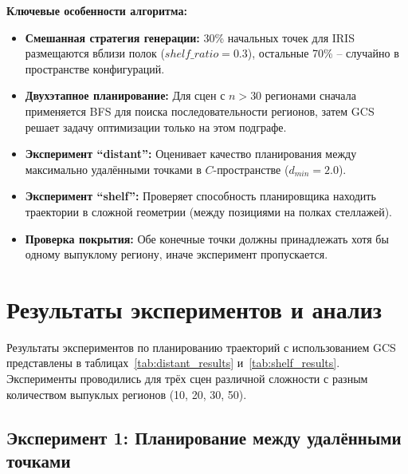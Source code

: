 \documentclass[a4paper]{article}
\begin{document}
\textbf{Ключевые особенности алгоритма:}
\begin{itemize}
    \item \textbf{Смешанная стратегия генерации:} 30\% начальных точек для IRIS размещаются вблизи полок ($shelf\_ratio = 0.3$), остальные 70\% -- случайно в пространстве конфигураций.
    
    \item \textbf{Двухэтапное планирование:} Для сцен с $n > 30$ регионами сначала применяется BFS для поиска последовательности регионов, затем GCS решает задачу оптимизации только на этом подграфе.
    
    \item \textbf{Эксперимент ``distant'':} Оценивает качество планирования между максимально удалёнными точками в $C$-пространстве ($d_{min} = 2.0$).
    
    \item \textbf{Эксперимент ``shelf'':} Проверяет способность планировщика находить траектории в сложной геометрии (между позициями на полках стеллажей).
    
    \item \textbf{Проверка покрытия:} Обе конечные точки должны принадлежать хотя бы одному выпуклому региону, иначе эксперимент пропускается.
\end{itemize}


\section{Результаты экспериментов и анализ}

Результаты экспериментов по планированию траекторий с использованием GCS представлены в таблицах~\ref{tab:distant_results} и~\ref{tab:shelf_results}. Эксперименты проводились для трёх сцен различной сложности с разным количеством выпуклых регионов (10, 20, 30, 50).

\subsection{Эксперимент 1: Планирование между удалёнными точками}
\end{document}
